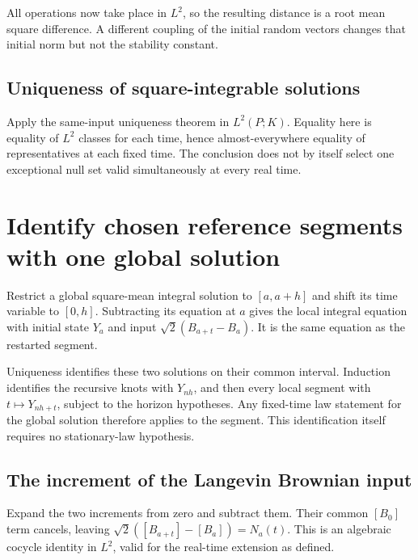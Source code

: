 \documentclass[11pt,a4paper]{article}
\begin{document}
All operations now take place in \(L^2\), so the resulting distance is a root mean square difference. A different coupling of the initial random vectors changes that initial norm but not the stability constant.


\subsection{\texorpdfstring{Uniqueness of square-integrable solutions}{Uniqueness of square-integrable solutions}}


Apply the same-input uniqueness theorem in \(L^2(P;K)\). Equality here is equality of \(L^2\) classes for each time, hence almost-everywhere equality of representatives at each fixed time. The conclusion does not by itself select one exceptional null set valid simultaneously at every real time.


\section{\texorpdfstring{Identify chosen reference segments with one global solution}{Identify chosen reference segments with one global solution}}


Restrict a global square-mean integral solution to \([a,a+h]\) and shift its time variable to \([0,h]\). Subtracting its equation at \(a\) gives the local integral equation with initial state \(Y_a\) and input \(\sqrt2(B_{a+t}-B_a)\). It is the same equation as the restarted segment.



Uniqueness identifies these two solutions on their common interval. Induction identifies the recursive knots with \(Y_{nh}\), and then every local segment with \(t\mapsto Y_{nh+t}\), subject to the horizon hypotheses. Any fixed-time law statement for the global solution therefore applies to the segment. This identification itself requires no stationary-law hypothesis.


\subsection{\texorpdfstring{The increment of the Langevin Brownian input}{The increment of the Langevin Brownian input}}


Expand the two increments from zero and subtract them. Their common \([B_0]\) term cancels, leaving \(\sqrt2([B_{a+t}]-[B_a])=N_a(t)\). This is an algebraic cocycle identity in \(L^2\), valid for the real-time extension as defined.
\end{document}

